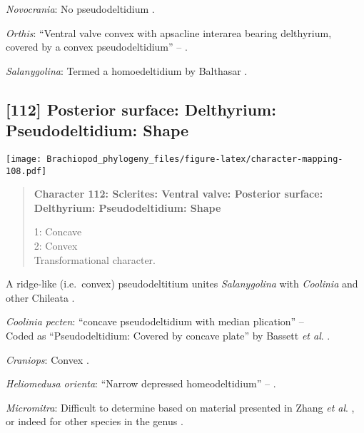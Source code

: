 \documentclass[openany]{book}
\theoremstyle{definition}
\theoremstyle{definition}
\theoremstyle{definition}
\theoremstyle{remark}
\begin{document}
\hypertarget{Novocrania-coding-111}{}
\emph{Novocrania}: No pseudodeltidium
\citep[p.~153]{Williams2000LinguliformeaCraniiformea}.

\hypertarget{Orthis-coding-111}{}
\emph{Orthis}: ``Ventral valve convex with apsacline interarea bearing
delthyrium, covered by a convex pseudodeltidium'' --
\citet{Holmer2008TheEarly}.

\hypertarget{Salanygolina-coding-111}{}
\emph{Salanygolina}: Termed a homoedeltidium by Balthasar
\citeyearpar{Balthasar2004Shellstructure}.

\subsection*{{[}112{]} Posterior surface: Delthyrium: Pseudodeltidium:
Shape}\label{posterior-surface-delthyrium-pseudodeltidium-shape}

\texttt{[image: Brachiopod\_phylogeny\_files/figure-latex/character-mapping-108.pdf]}

\begin{quote}
\textbf{Character 112: Sclerites: Ventral valve: Posterior surface:
Delthyrium: Pseudodeltidium: Shape}

1: Concave\\
2: Convex\\
Transformational character.
\end{quote}

A ridge-like (i.e.~convex) pseudodeltitium unites \emph{Salanygolina}
with \emph{Coolinia} and other Chileata
\citep[p.~6]{Holmer2009Theenigmatic}.

\hypertarget{Coolinia_pecten-coding-112}{}
\emph{Coolinia pecten}: ``concave pseudodeltidium with median
plication'' -- \citet{Williams2000LinguliformeaCraniiformea}\\
Coded as ``Pseudodeltidium: Covered by concave plate'' by Bassett
\emph{et al}. \citeyearpar{Bassett2001Functionalmorphology}.

\hypertarget{Craniops-coding-112}{}
\emph{Craniops}: Convex \citep[fig.
508]{Williams2000LinguliformeaCraniiformea}.

\hypertarget{Heliomedusa_orienta-coding-112}{}
\emph{Heliomedusa orienta}: ``Narrow depressed homeodeltidium'' --
\citet{Hanken1985Thetaxonomy}.

\hypertarget{Micromitra-coding-112}{}
\emph{Micromitra}: Difficult to determine based on material presented in
Zhang \emph{et al}.
\citeyearpar{Zhang2007Rhynchonelliformeanbrachiopods}, or indeed for
other species in the genus
\citep[e.g.][]{Williams2000LinguliformeaCraniiformea, Skovsted2005EarlyCambrian, Holmer2018Theattachment}.
\end{document}
